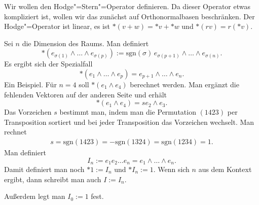 \documentclass[a4paper,11pt,fleqn,twocolumn,twoside]{scrartcl}
\numberwithin{equation}{section}
\begin{document}
Wir wollen den Hodge"=Stern"=Operator definieren. Da dieser Operator
etwas kompliziert ist, wollen wir das zunächst auf Orthonormalbasen
beschränken. Der Hodge"=Operator ist linear, es ist
$*(v+w) = *v+*w$ und $*(rv)=r(*v)$.

Sei $n$ die Dimension des Raums. Man definiert
\[*(e_{\sigma(1)}\wedge\ldots\wedge e_{\sigma(p)})
:= \mathrm{sgn}(\sigma)\,e_{\sigma(p+1)}\wedge\ldots\wedge e_{\sigma(n)}.\]
Es ergibt sich der Spezialfall
\begin{equation}
*(e_1\wedge\ldots\wedge e_p) = e_{p+1}\wedge\ldots\wedge e_n.
\end{equation}
Ein Beispiel. Für $n=4$ soll $*(e_1\wedge e_4)$
berechnet werden. Man ergänzt die fehlenden Vektoren
auf der anderen Seite und erhält
\begin{equation}
*(e_1\wedge e_4) = se_2\wedge e_3.
\end{equation}
Das Vorzeichen $s$ bestimmt man, indem man die Permutation
$(1423)$ per Transposition sortiert und bei jeder Transposition
das Vorzeichen wechselt. Man rechnet
\begin{gather*}
s = \mathrm{sgn}(1423)=-\mathrm{sgn}(1324) = \mathrm{sgn}(1234) = 1.
\end{gather*}
Man definiert
\begin{equation}
I_n := e_1e_2\ldots e_n = e_1\wedge\ldots\wedge e_n.
\end{equation}
Damit definiert man noch $*1:=I_n$ und $*I_n:=1$.
Wenn sich $n$ aus dem Kontext ergibt, dann schreibt man auch $I:=I_n$.

Außerdem legt man $I_0:=1$ fest.
\end{document}
